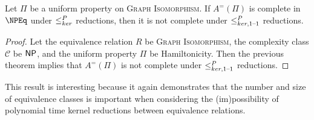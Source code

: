 \begin{corollary}\label{cor:inj}
  Let $\Pi$ be a uniform property on \textsc{Graph Isomorphism}.
  If $A^=(\Pi)$ is complete in $\NPEq$ under $\leq^{P}_{ker}$ reductions, then it is not complete under $\leq^{P}_{ker,1\text{--}1}$ reductions.
\end{corollary}
\begin{proof}
  Let the equivalence relation $R$ be \textsc{Graph Isomorphism}, the complexity class $\mathcal{C}$ be ${\mathsf{NP}}$, and the uniform property $\Pi$ be Hamiltonicity.
  Then the previous theorem implies that $A^=(\Pi)$ is not complete under $\leq^{P}_{ker,1\text{--}1}$ reductions.
\end{proof}

This result is interesting because it again demonstrates that the number and size of equivalence classes is important when considering the (im)possibility of polynomial time kernel reductions between equivalence relations.
